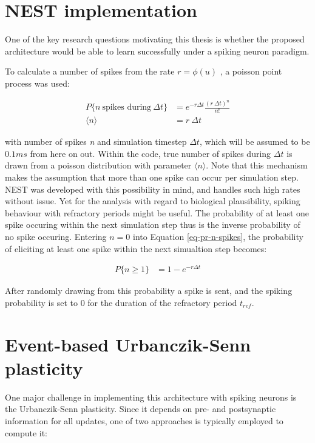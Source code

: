 \section{NEST implementation}

One of the key research questions motivating this thesis is whether the proposed architecture would be able to
learn successfully under a spiking neuron paradigm. 


To calculate a number of spikes from the rate $r = \phi(u)$
, a poisson point process was used:

\begin{align}
  P\{\textit{n} \ \text{spikes during} \ \Delta t\} & = e^{-r \Delta t} \frac{(r \ \Delta t) ^ n}{n!}\label{eq-pr-n-spikes} \\
  \langle \textit{n} \rangle                        & = r \ \Delta t
\end{align}

with number of spikes \textit{n} and simulation timestep $\Delta t$, which will be assumed to be $0.1 ms$ from here
on out. Within the code, true number of spikes during $\Delta t$ is drawn from a poisson distribution with parameter
$\langle n \rangle$.
Note that this mechanism makes the assumption that more than one spike can occur per simulation step. NEST was
developed with this possibility in mind, and handles such high rates without issue. Yet for the analysis with regard to
biological plausibility, spiking behaviour with refractory periods might be useful. The probability of at least
one spike occuring within the next simulation step thus is the inverse probability of no spike occuring. Entering $n=0$
into Equation \ref{eq-pr-n-spikes}, the probability of eliciting at least one spike within the next simualtion step
becomes:

\begin{align}
  P\{ \textit{n} \geq 1\} & = 1 - e^{-r \Delta t}
\end{align}


After randomly drawing from this probability a spike is sent, and the spiking probability is set to 0 for the duration
of the refractory period $t_{ref}$.

\section{Event-based Urbanczik-Senn plasticity}

One major challenge in implementing this architecture with spiking neurons is the Urbanczik-Senn plasticity. Since it
depends on pre- and postsynaptic information for all updates, one of two approaches is typically employed to compute
it:

